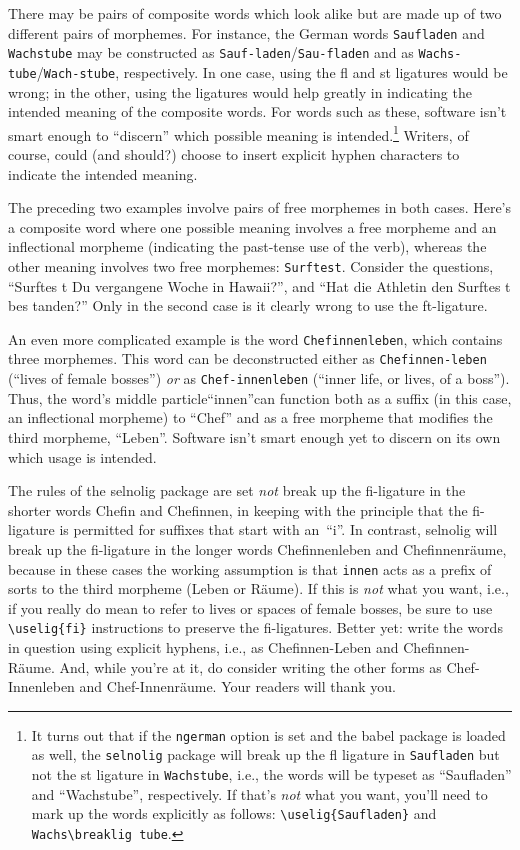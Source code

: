\documentclass[11pt]{article}
\newcommand{\pkg}[1]{\textsf{#1}}
\newcommand{\opt}[1]{\texttt{#1}}
\begin{document}
There may be pairs of composite words which look alike but are made up of two different pairs of morphemes. For instance, the German words \opt{Saufladen} and \opt{Wachstube} may be constructed as \opt{Sauf-laden}\slash \opt{Sau-fladen} and as \opt{Wachs-tube}\slash \opt{Wach-stube}, respectively. In one case, using the fl and st ligatures would be wrong; in the other, using the ligatures would help greatly in indicating the intended meaning of the composite words. 
For words such as these, software isn't smart enough to \enquote{discern} which possible meaning is intended.\footnote{It turns out that if the \opt{ngerman} option is set and the \pkg{babel} package is loaded as well, the \opt{selnolig} package will break up the fl ligature in \opt{Saufladen} but not the st ligature in \opt{Wachstube}, i.e., the words will be typeset as \enquote{Saufladen} and \enquote{Wachstube}, respectively. If that's \emph{not} what you want, you'll need to mark up the words explicitly as follows: \Verb+\uselig{Saufladen}+ and \Verb+Wachs\breaklig tube+.} 
Writers, of course, could (and should?) choose to insert explicit hyphen characters to indicate the intended meaning.

The preceding two examples involve pairs of free morphemes in both cases. Here's a composite word where one possible meaning involves a free morpheme and an inflectional morpheme (indicating the past-tense use of the verb), whereas the other meaning involves two free morphemes: \opt{Surftest}. Consider the questions, \enquote{Surftes\kern0pt t Du vergangene Woche in Hawaii?}, and \enquote{Hat die Athletin den Surf\breaklig tes\kern0pt t bes\kern0pt tanden?} Only in the second case is it clearly wrong to use the ft-ligature.

An even more complicated example is the word \opt{Chefinnenleben}, which contains three morphemes. This word can be deconstructed either as \opt{Chefinnen-leben} (\enquote{lives of female bosses}) \emph{or} as \opt{Chef-innenleben} (\enquote{inner life, or lives, of a boss}). Thus, the word's middle particle\textemdash\enquote{innen}\textemdash can function both as a suffix (in this case, an inflectional morpheme) to \enquote{Chef} and as a free morpheme that modifies the third morpheme, \enquote{Leben}. Software isn't smart enough yet to discern on its own which usage is intended.

The rules of the \pkg{selnolig} package are set \emph{not} break up the fi-ligature in the shorter words Chefin and Chefinnen, in keeping with the principle that the fi-ligature is permitted for suffixes that start with an~\enquote{i}. In contrast, \pkg{selnolig} will break up the fi-ligature in the longer words Chefinnenleben and Chefinnenräume, because in these cases the working assumption is that \opt{innen} acts as a prefix of sorts to the third morpheme (Leben or Räume). If this is \emph{not} what you want, i.e., if you really do mean to refer to lives or spaces of female bosses, be sure to use \Verb+\uselig{fi}+ instructions to preserve the fi-ligatures. Better yet: write the words in question using explicit hyphens, i.e., as Chefinnen-Leben and Chefinnen-Räume. And, while you're at it, do consider writing the other forms as Chef-Innenleben and Chef-Innenräume. Your readers will thank you.
\end{document}
